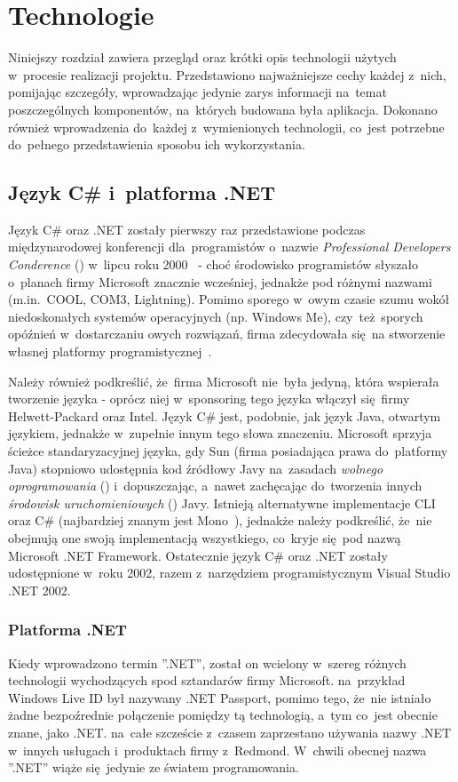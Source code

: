 \chapter{Technologie}\label{chap:technologie}

Niniejszy rozdział zawiera przegląd oraz krótki opis technologii użytych w~procesie realizacji projektu. Przedstawiono najważniejsze cechy każdej z~nich, pomijając szczegóły, wprowadzając jedynie zarys informacji na~temat poszczególnych komponentów, na~których budowana była aplikacja. Dokonano również wprowadzenia do~każdej z~wymienionych technologii, co~jest potrzebne do~pełnego przedstawienia sposobu ich wykorzystania.

\section{Język C\# i~platforma .NET}\label{sec:cs}
Język C\# oraz .NET zostały pierwszy raz przedstawione podczas międzynarodowej konferencji dla~programistów o~nazwie \emph{Professional Developers Conderence} () w~lipcu roku 2000~\cite{ms:initDotNet} - choć środowisko programistów słyszało o~planach firmy Microsoft znacznie wcześniej, jednakże pod różnymi nazwami (m.in.~COOL, COM3, Lightning). Pomimo sporego w~owym czasie szumu wokół niedoskonałych systemów operacyjnych (np. Windows Me), czy~też~sporych opóźnień w~dostarczaniu owych rozwiązań, firma zdecydowała się~na stworzenie własnej platformy programistycznej~\cite{cSharp:inDepthF}.

Należy również podkreślić, że~firma Microsoft nie~była jedyną, która wspierała tworzenie języka - oprócz niej w~sponsoring tego języka włączył się~firmy Helwett-Packard oraz Intel. Język C\# jest, podobnie, jak język Java, otwartym językiem, jednakże w~zupełnie innym tego słowa znaczeniu. Microsoft sprzyja ścieżce standaryzacyjnej języka, gdy Sun (firma posiadająca prawa do~platformy Java) stopniowo udostępnia kod źródłowy Javy na~zasadach \emph{wolnego oprogramowania} () i~dopuszczając, a~nawet zachęcając do~tworzenia innych \emph{środowisk uruchomieniowych} () Javy. Istnieją alternatywne implementacje CLI oraz C\# (najbardziej znanym jest Mono~\cite{cs:mono}), jednakże należy podkreślić, że~nie obejmują one swoją implementacją wszystkiego, co~kryje się~pod nazwą Microsoft .NET Framework. Ostatecznie język C\# oraz .NET zostały udostępnione w~roku 2002, razem z~narzędziem programistycznym Visual Studio .NET 2002.

\subsection{Platforma .NET}
Kiedy wprowadzono termin ''.NET'', został on wcielony w~szereg różnych technologii wychodzących spod sztandarów firmy Microsoft. na~przykład Windows Live ID był nazywany .NET Passport, pomimo tego, że~nie istniało żadne bezpoźrednie połączenie pomiędzy tą technologią, a~tym co~jest obecnie znane, jako .NET. na~całe szczeście z~czasem zaprzestano używania nazwy .NET w~innych usługach i~produktach firmy z~Redmond. W~chwili obecnej nazwa ''.NET'' wiąże się~jedynie ze światem programowania.

